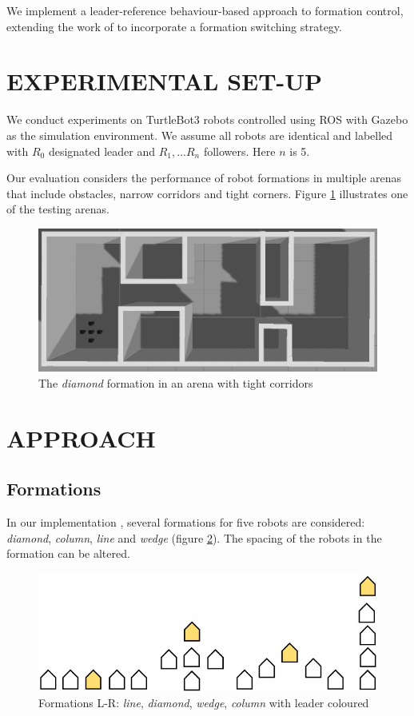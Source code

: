 \documentclass[letterpaper, 10 pt, conference]{ieeeconf}  %
\begin{document}
We implement a leader-reference behaviour-based approach to formation control, extending the work of \cite{c2} to incorporate a formation switching strategy.

\section{EXPERIMENTAL SET-UP}

We conduct experiments on TurtleBot3 \cite{turtlebot} robots controlled using ROS \cite{ros} with Gazebo \cite{gazebo} as the simulation environment. We assume all robots are identical and labelled 
with $R_0$ designated leader and $R_1,...R_n$ followers. Here $n$ is 5.

Our evaluation considers the performance of robot formations in multiple arenas that include obstacles, narrow corridors and tight corners. Figure \ref{corridorworld} illustrates one of the testing arenas.

\begin{figure}[thpb]
\centering
\includegraphics[width=\linewidth]{images/corridorworld.png}
\caption{The \textit{diamond} formation in an arena with tight corridors}
\label{corridorworld}
\end{figure}

\section{APPROACH}
\subsection{Formations}
In our implementation \cite{repository}, several formations for five robots are considered: \textit{diamond}, \textit{column}, \textit{line} and \textit{wedge} (figure \ref{formation_shapes}). The spacing of the robots in the formation can be altered. 
   
\begin{figure}[thpb]
\centering
\includegraphics[width=0.7\linewidth]{images/formation_shapes.jpg}
\caption{Formations L-R: \textit{line}, \textit{diamond}, \textit{wedge}, \textit{column} with leader coloured}
\label{formation_shapes}
\end{figure}
\end{document}
